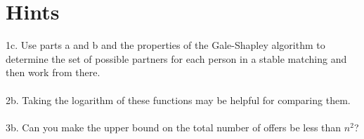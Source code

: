 \documentclass[12pt]{article}
\begin{document}
\vspace{10mm}
\section*{Hints}
1c. Use parts a and b and the properties of the Gale-Shapley algorithm to determine the set of possible partners for each person in a stable matching and then work from there.\\
\\
2b. Taking the logarithm of these functions may be helpful for comparing them.\\
\\
3b. Can you make the upper bound on the total number of offers be less than $n^2$?
\end{document}
